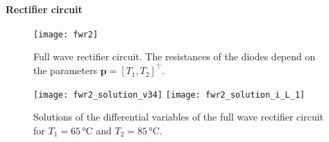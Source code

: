\documentclass[AMA,STIX1COL]{WileyNJD-v2}
\newcommand{\mb}[1]{\mathbf{#1}}
\newcommand{\T}{{\!\top}}
\begin{document}
\paragraph{Rectifier circuit}
\begin{figure}[t]
    \begin{center}
        \texttt{[image: fwr2]}
    \end{center}
    \caption{Full wave rectifier circuit. The resistances of the diodes depend on the parameters $\mb{p} = [T_1, T_2]^\T$.}
    \label{fig:ne_fwr2}
\end{figure}

\begin{figure}[b]
    \begin{center}
        \texttt{[image: fwr2\_solution\_v34]} \hspace{1.5cm} \texttt{[image: fwr2\_solution\_i\_L\_1]}
    \end{center}
    \caption{Solutions of the differential variables of the full wave rectifier circuit for $T_1 = 65\, \si{\celsius}$ and $T_2 = 85\, \si{\celsius}$.}
    \label{fig:ne_fwr2_solution_d}
\end{figure}
\end{document}

